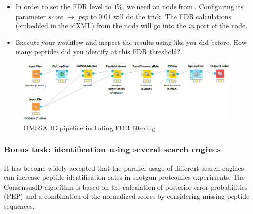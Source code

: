 \begin{itemize}
\item
In order to set the FDR level to $1\%$, we need an  node from .
Configuring its parameter \textit{score $\rightarrow$ pep} to $0.01$ will do the trick.
The FDR calculations (embedded in the idXML) from the  node will go into the \textit{in} port of the  node.
\item
Execute your workflow and inspect the results using  like you did before.
How many peptides did you identify at this FDR threshold?
\end{itemize}

\begin{figure}[htbp]
  \centering
  \includegraphics[width=\textwidth]{graphics/labelfree/PepIdFDR.png}
  \caption{OMSSA ID pipeline including FDR filtering.}
  \label{fig:id_fdr}
\end{figure}

\subsubsection{Bonus task: identification using several search engines}
It has become widely accepted that the parallel usage of different search engines can increase peptide identification rates in shotgun proteomics experiments. The ConsensusID algorithm is based on the calculation of posterior error probabilities (PEP) and a combination of the normalized scores by considering missing peptide sequences.


